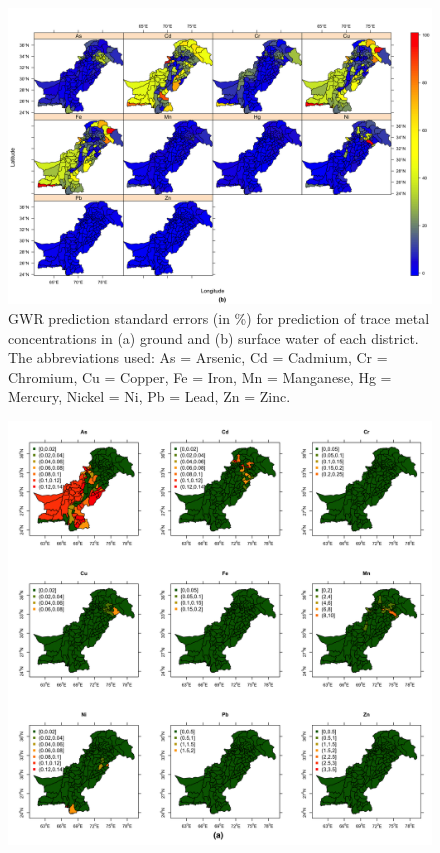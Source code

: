 \newpage

\begin{landscape}

\begin{figure}[hp!]
  \centering
  \vspace{-2cm} \includegraphics[width=\linewidth]{Figures/Fig_D_2_b.png}
  \caption{GWR prediction standard errors (in \%) for prediction of trace metal concentrations in (a) ground and (b) surface water of each district. The abbreviations used: As = Arsenic, Cd = Cadmium, Cr = Chromium, Cu = Copper, Fe = Iron, Mn = Manganese, Hg = Mercury, Nickel = Ni, Pb = Lead, Zn = Zinc.}
  \label{Fig_D_2_b}
\end{figure}

\end{landscape}

\newpage

\begin{figure}[hp!]
  \centering
  \includegraphics[width=1.1\textwidth]{Figures/Fig_D_3_a.png}
  \label{Fig_D_3_a}
\end{figure}

